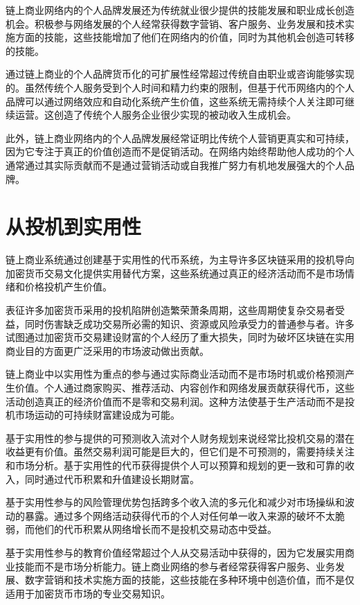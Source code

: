\documentclass[
  Letterpaper,
]{scrbook}
\begin{document}
链上商业网络内的个人品牌发展还为传统就业很少提供的技能发展和职业成长创造机会。积极参与网络发展的个人经常获得数字营销、客户服务、业务发展和技术实施方面的技能，这些技能增加了他们在网络内的价值，同时为其他机会创造可转移的技能。

通过链上商业的个人品牌货币化的可扩展性经常超过传统自由职业或咨询能够实现的。虽然传统个人服务受到个人时间和精力约束的限制，但基于代币网络内的个人品牌可以通过网络效应和自动化系统产生价值，这些系统无需持续个人关注即可继续运营。这创造了传统个人服务企业很少实现的被动收入生成机会。

此外，链上商业网络内的个人品牌发展经常证明比传统个人营销更真实和可持续，因为它专注于真正的价值创造而不是促销活动。在网络内始终帮助他人成功的个人通常通过其实际贡献而不是通过营销活动或自我推广努力有机地发展强大的个人品牌。

\section{从投机到实用性}\label{ux4eceux6295ux673aux5230ux5b9eux7528ux6027}

链上商业系统通过创建基于实用性的代币系统，为主导许多区块链采用的投机导向加密货币交易文化提供实用替代方案，这些系统通过真正的经济活动而不是市场情绪和价格投机产生价值。

表征许多加密货币采用的投机陷阱创造繁荣萧条周期，这些周期使复杂交易者受益，同时伤害缺乏成功交易所必需的知识、资源或风险承受力的普通参与者。许多试图通过加密货币交易建设财富的个人经历了重大损失，同时为破坏区块链在实用商业目的方面更广泛采用的市场波动做出贡献。

链上商业中以实用性为重点的参与通过实际商业活动而不是市场时机或价格预测产生价值。个人通过商家购买、推荐活动、内容创作和网络发展贡献获得代币，这些活动创造真正的经济价值而不是零和交易利润。这种方法使基于生产活动而不是投机市场运动的可持续财富建设成为可能。

基于实用性的参与提供的可预测收入流对个人财务规划来说经常比投机交易的潜在收益更有价值。虽然交易利润可能是巨大的，但它们是不可预测的，需要持续关注和市场分析。基于实用性的代币获得提供个人可以预算和规划的更一致和可靠的收入，同时通过代币积累和升值建设长期财富。

基于实用性参与的风险管理优势包括跨多个收入流的多元化和减少对市场操纵和波动的暴露。通过多个网络活动获得代币的个人对任何单一收入来源的破坏不太脆弱，而他们的代币积累从网络增长而不是投机交易动态中受益。

基于实用性参与的教育价值经常超过个人从交易活动中获得的，因为它发展实用商业技能而不是市场分析能力。链上商业网络的参与者经常获得客户服务、业务发展、数字营销和技术实施方面的技能，这些技能在多种环境中创造价值，而不是仅适用于加密货币市场的专业交易知识。
\end{document}
